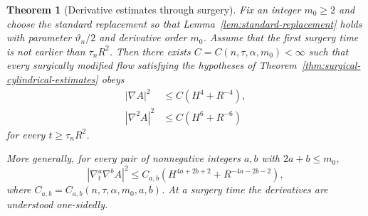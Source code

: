 \documentclass[11pt,reqno]{amsart}
\newtheorem{theorem}[proposition]{Theorem}
\theoremstyle{definition}
\theoremstyle{remark}
\numberwithin{equation}{section}
\begin{document}
\begin{theorem}[Derivative estimates through surgery]
  \label{thm:estimates-through-surgery}
  Fix an integer $m_0\geq2$ and choose the standard replacement so that
  Lemma~\ref{lem:standard-replacement} holds with parameter $\vartheta_n/2$
  and derivative order $m_0$.  Assume that the first surgery time is not
  earlier than $\tau_nR^2$.  Then there exists $C=C(n,\tau,\alpha,m_0)<\infty$  
  such that every surgically modified flow satisfying the hypotheses of
  Theorem~\ref{thm:surgical-cylindrical-estimates} obeys
  \begin{align}
    |\nabla A|^2
    &\leq
    C(H^4+R^{-4}),
    \label{eq:surgical-gradient}\\
    |\nabla^2A|^2
    &\leq
    C(H^6+R^{-6})
    \label{eq:surgical-hessian}
  \end{align}
  for every $t\geq\tau_nR^2$.

  More generally, for every pair of nonnegative integers $a,b$ with
  $2a+b\leq m_0$,
  \begin{equation}\label{eq:surgical-higher-derivatives}
    |\nabla_t^a\nabla^bA|^2
    \leq
    C_{a,b}
    \left(
    H^{4a+2b+2}+R^{-4a-2b-2}
    \right),
  \end{equation}
  where $ C_{a,b}
  =  C_{a,b}(n,\tau,\alpha,m_0,a,b)$.  
  At a surgery time the derivatives are understood one-sidedly.
\end{theorem}
\end{document}
